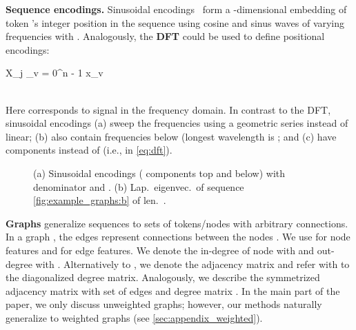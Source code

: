 \documentclass{article}
\newcommand{\PE}{\operatorname{PE}}
\begin{document}
\textbf{Sequence encodings.} Sinusoidal encodings~\citep{vaswani_attention_2017} form a -dimensional embedding of token 's integer position in the sequence using cosine  and sinus  waves of varying frequencies with . Analogously, the \textbf{DFT} could be used to define positional encodings:

      X_j \coloneqq
      \sum\limits_{v = 0}^{n - 1} x_v \Big[ \underbrace{\cos\Big(v \cdot \frac{2 \pi}{n} j \Big)}_{\PE^{(\text{DFT})}_{v, 2j}} - i \cdot \underbrace{\sin\Big(v \cdot \frac{2 \pi}{n} j \Big)}_{\PE^{(\text{DFT})}_{v, 2j + 1}} \Big]
      
\\
Here  corresponds to signal  in the frequency domain. In contrast to the DFT, sinusoidal encodings (a) sweep the frequencies using a geometric series instead of linear; (b) also contain frequencies below  (longest wavelength is ; and (c) have  components instead of  (i.e.,  in \autoref{eq:dft}).

\begin{figure}[t]
  \centering
  \hfill{}
  \caption{(a) Sinusoidal encodings ( components top and  below) with denominator  and . (b) Lap.\ eigenvec.\ of sequence \autoref{fig:example_graphs:b} of len.\ .
  \label{fig:sin_lap_bitmap}}
  \vspace{-0.1in}
\end{figure}

\textbf{Graphs} generalize sequences to sets of tokens/nodes with arbitrary connections. In a graph , the  edges  represent connections between the  nodes . We use  for node features and  for edge features. We denote the in-degree of node  with  and out-degree with . Alternatively to , we denote the adjacency matrix  and refer with  to the diagonalized degree matrix. Analogously, we describe the symmetrized adjacency matrix  with set of edges  and degree matrix  . In the main part of the paper, we only discuss unweighted graphs; however, our methods naturally generalize to weighted graphs (see \autoref{sec:appendix_weighted}).
\end{document}
